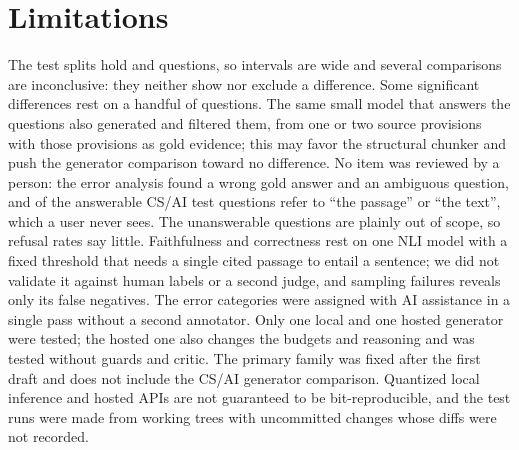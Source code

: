 \section{Limitations}
\label{sec:limitations}

The test splits hold  and  questions, so intervals are wide and several comparisons are inconclusive: they neither show nor exclude a difference. Some significant differences rest on a handful of questions.
The same small model that answers the questions also generated and filtered them, from one or two source provisions with those provisions as gold evidence; this may favor the structural chunker and push the generator comparison toward no difference.
No item was reviewed by a person: the error analysis found a wrong gold answer and an ambiguous question, and  of the  answerable CS/AI test questions refer to ``the passage'' or ``the text'', which a user never sees. The unanswerable questions are plainly out of scope, so refusal rates say little.
Faithfulness and correctness rest on one NLI model with a fixed threshold that needs a single cited passage to entail a sentence; we did not validate it against human labels or a second judge, and sampling failures reveals only its false negatives. The error categories were assigned with AI assistance in a single pass without a second annotator.
Only one local and one hosted generator were tested; the hosted one also changes the budgets and reasoning and was tested without guards and critic. The primary family was fixed after the first draft and does not include the CS/AI generator comparison.
Quantized local inference and hosted APIs are not guaranteed to be bit-reproducible, and the test runs were made from working trees with uncommitted changes whose diffs were not recorded.
